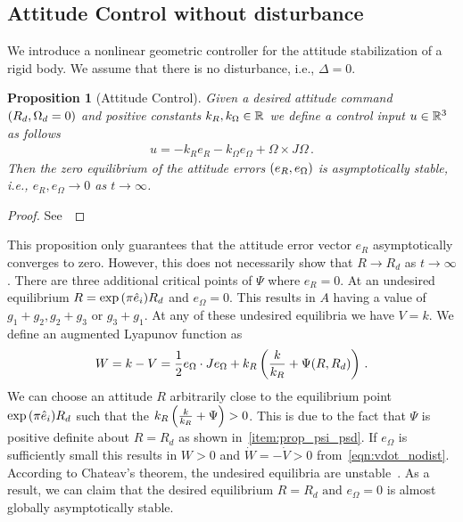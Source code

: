 \documentclass[letterpaper, 10 pt, conference]{ieeeconf}  %
\newtheorem{prop}{Proposition}
\begin{document}
\subsection{Attitude Control without disturbance}
We introduce a nonlinear geometric controller for the attitude stabilization of a rigid body.
We assume that there is no disturbance, i.e., \( \Delta = 0 \).
\begin{prop}[Attitude Control]\label{prop:att_control}
	Given a desired attitude command \( \left( R_d, \Omega_d = 0 \right) \) and positive constants \( k_R, k_\Omega \in \mathbb{R} \) we define a control input \( u \in \mathbb{R}^3 \) as follows
	\begin{gather}
		u = -k_R e_R - k_\Omega e_\Omega + \Omega \times J \Omega \, . \label{eqn:nodist_control}
	\end{gather}
	Then the zero equilibrium of the attitude errors \( \left( e_R, e_\Omega \right) \) is asymptotically stable, i.e., \(e_R, e_\Omega \to 0 \) as \( t \to \infty \).
\end{prop}

\begin{proof}
See~
\end{proof}

This proposition only guarantees that the attitude error vector \( e_R \) asymptotically converges to zero.
However, this does not necessarily show that \( R \to R_d \) as \( t \to \infty \). 
There are three additional critical points of \( \Psi \) where \( e_R = 0 \).
At an undesired equilibrium \( R = \exp{ \ensuremath{\left( \pi \hat{e}_i \right)}} R_d \) and \( e_\Omega =0 \). 
This results in \( A \) having a value of \( g_1 + g_2, g_2 + g_3 \) or \( g_3 + g_1 \).
At any of these undesired equilibria we have \( V = k \). 
We define an augmented Lyapunov function as
\begin{align*}
	W = k - V = \frac{1}{2} e_\Omega \cdot J e_\Omega + k_R \left( \frac{k}{k_R}+ \Psi(R,R_d) \right) \, .
\end{align*}
We can choose an attitude \( R \) arbitrarily close to the equilibrium point \( \exp{ \ensuremath{\left( \pi \hat{e}_i \right)}} R_d \) such that the \( k_R \left( \frac{k}{k_R}+\Psi  \right)> 0 \).
This is due to the fact that \( \Psi \) is positive definite about \( R = R_d \) as shown in~\cref{item:prop_psi_psd}.
If \( e_\Omega \) is sufficiently small this results in \( W > 0 \) and \( \dot{W} = -\dot{V} > 0\) from~\cref{eqn:vdot_nodist}.
According to Chateav's theorem, the undesired equilibria are unstable~\cite{khalil1996}.
As a result, we can claim that the desired equilibrium \( R = R_d \text{ and } e_\Omega = 0 \) is almost globally asymptotically stable.
\end{document}
